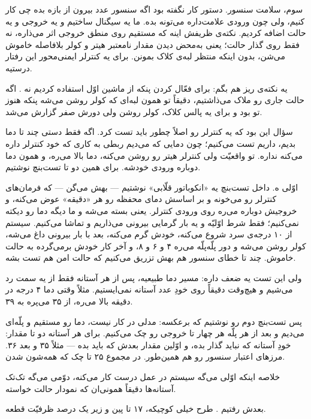 \documentclass[12pt,a4paper]{article}
\newcommand{\cue}[2]{%
  \par\addvspace{1.1em}%
  \noindent{\small\bfseries\color{cuecolor}\lr{#1}\quad\textbullet\quad #2}%
  \par\nobreak\addvspace{0.3em}%
}
\begin{document}
سوم، سلامت سنسور. دستور کار نگفته بود اگه سنسور عدد بیرون از بازه بده چی کار کنیم، ولی چون ورودی علامت‌داره می‌تونه بده. ما یه سیگنال  ساختیم و یه خروجی  و یه حالت  اضافه کردیم. نکته‌ی ظریفش اینه که  مستقیم روی منطق خروجی اثر می‌ذاره، نه فقط روی گذار حالت؛ یعنی به‌محض دیدن مقدار نامعتبر هیتر و کولر بلافاصله خاموش می‌شن، بدون اینکه منتظر لبه‌ی کلاک بمونن. برای یه کنترلر ایمنی‌محور این رفتار درستیه.

یه نکته‌ی ریز هم بگم: برای فعّال کردن  پنکه از  ماشین اوّل استفاده کردیم نه . اگه حالت جاری رو ملاک می‌ذاشتیم، دقیقاً تو همون لبه‌ای که کولر روشن می‌شه پنکه هنوز تو  بود و برای یه پالس کلاک، کولر روشن ولی دورش صفر گزارش می‌شد.

\cue{2:55}{تست‌بنچ‌ها --- چرا دو تا؟}
سؤال این بود که یه کنترلر رو اصلاً چطور باید تست کرد. اگه فقط دستی چند تا دما بدیم، داریم  تست می‌کنیم؛ چون دمایی که می‌دیم ربطی به کاری که خود کنترلر داره می‌کنه نداره. تو واقعیّت ولی کنترلر هیتر رو روشن می‌کنه، دما بالا می‌ره، و همون دما دوباره ورودی خودشه. برای همین دو تا تست‌بنچ نوشتیم.

اوّلی ه. داخل تست‌بنچ یه «انکوباتور قلّابی» نوشتیم --- بهش می‌گن  --- که فرمان‌های کنترلر رو می‌خونه و بر اساسش دمای محفظه رو هر «دقیقه» عوض می‌کنه، و خروجیش دوباره می‌ره روی ورودی کنترلر. یعنی  بسته می‌شه و ما دیگه دما رو دیکته نمی‌کنیم؛ فقط شرط اوّلیّه و یه بار گرمایی بیرونی می‌ذاریم و تماشا می‌کنیم. سیستم از ۱۰ درجه‌ی سرد شروع می‌کنه، خودش گرم می‌کنه، بعد با بار بیرونی داغ می‌شه، کولر روشن می‌شه و دور پلّه‌پلّه می‌ره ۴ و ۶ و ۸، و آخر کار خودش برمی‌گرده به حالت خاموش. چند تا خطای سنسور هم بهش تزریق می‌کنیم که حالت امن هم تست بشه.

ولی این تست یه ضعف داره: مسیر دما طبیعیه، پس از هر آستانه فقط از یه سمت رد می‌شیم و هیچ‌وقت دقیقاً روی خودِ عدد آستانه نمی‌ایستیم. مثلاً وقتی دما ۴ درجه در دقیقه بالا می‌ره، از ۳۵ می‌پره به ۳۹.

پس تست‌بنچ دوم رو نوشتیم که برعکسه: مدلی در کار نیست، دما رو مستقیم و پلّه‌ای می‌دیم و بعد از هر پلّه هر چهار تا خروجی رو چک می‌کنیم. برای هر آستانه دو تا مقدار: خودِ آستانه که نباید گذار بده، و اوّلین مقدار بعدش که باید بده --- مثلاً ۳۵ و بعد ۳۶. مرزهای اعتبار سنسور رو هم همین‌طور. در مجموع ۲۵ تا چک که همه‌شون  شدن.

خلاصه اینکه اوّلی می‌گه سیستم در عمل درست کار می‌کنه، دوّمی می‌گه تک‌تک آستانه‌ها دقیقاً همونی‌ان که نمودار حالت خواسته.

\cue{4:00}{سنتز و رمزگذاری حالت}
بعدش رفتیم . طرح خیلی کوچیکه، ۱۷ تا پین و زیر یک درصد ظرفیّت قطعه.
\end{document}
